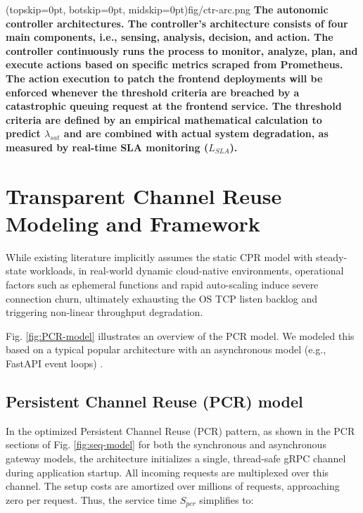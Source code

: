 \documentclass{ieeeaccess}
\begin{document}
	
	
	
	
	
	
	
	\Figure[t!](topskip=0pt, botskip=0pt, midskip=0pt){fig/ctr-arc.png}
	{ 
		\textbf{The autonomic controller architectures. The controller's architecture consists of four main components, i.e., sensing, analysis, decision, and action. The controller continuously runs the process to monitor, analyze, plan, and execute actions based on specific metrics scraped from Prometheus. The action execution to patch the frontend deployments will be enforced whenever the threshold criteria are breached by a catastrophic queuing request at the frontend service. The threshold criteria are defined by an empirical mathematical calculation to predict $\lambda_{sat}$ and are combined with actual system degradation, as measured by real-time SLA monitoring ($L_{SLA}$). }
		\label{fig:ctr-arc}
	}
	
	\section{Transparent Channel Reuse Modeling and Framework}
	\label{sec:auto-ctr}
	
	
	While existing literature implicitly assumes the static CPR model with steady-state workloads, in real-world dynamic cloud-native environments, operational factors such as ephemeral functions and rapid auto-scaling induce severe connection churn, ultimately exhausting the OS TCP listen backlog and triggering non-linear throughput degradation. 
	
	
	Fig. \ref{fig:PCR-model} illustrates an overview of the PCR model.  We modeled this based on a typical popular architecture with an asynchronous model (e.g., FastAPI event loops) \cite{uvicorn} .
	
	
	\subsection{Persistent Channel Reuse (PCR) model}
	
	In the optimized Persistent Channel Reuse (PCR) pattern, as shown in the PCR sections of Fig. \ref{fig:seq-model} for both the synchronous and asynchronous gateway models, the architecture initializes a single, thread-safe gRPC channel during application startup. All incoming requests are multiplexed over this channel. The setup costs are amortized over millions of requests, approaching zero per request. Thus, the service time $S_{pcr}$ simplifies to:
	
\end{document}
